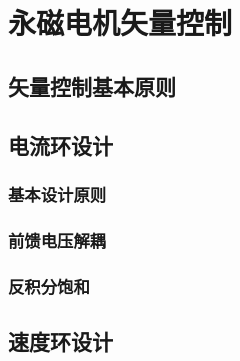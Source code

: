 \chapter{永磁电机矢量控制}\label{ch:mannual}
\section{矢量控制基本原则}
\section{电流环设计}
\subsection{基本设计原则}
\subsection{前馈电压解耦}
\subsection{反积分饱和}
\section{速度环设计}


